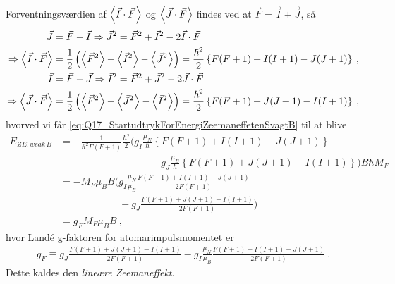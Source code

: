 Forventningsværdien af $\Braket{\Vec{I} \cdot \Vec{F}}$ og $\Braket{\Vec{J} \cdot \Vec{F}}$ findes ved at $\Vec{F} = \Vec{I} + \Vec{J}$, så
\begin{align}
    \Vec{J} &= \Vec{F} - \Vec{I} \Rightarrow \Vec{J}^2 = \Vec{F}^2 + \Vec{I}^2 - 2\Vec{I} \cdot \Vec{F} \nonumber\\
    \Rightarrow \Braket{\Vec{I} \cdot \Vec{F}} &= \frac{1}{2} \left(\Braket{\Vec{F}^2} + \Braket{\Vec{I}^2} - \Braket{\Vec{J}^2}\right) = \frac{\hbar^2}{2} \left\{F(F+1) + I(I+1) - J(J+1)\right\} \: , \\
    \Vec{I} &= \Vec{F} - \Vec{J} \Rightarrow \Vec{I}^2 = \Vec{F}^2 + \Vec{J}^2 - 2\Vec{J} \cdot \Vec{F} \nonumber\\
    \Rightarrow \Braket{\Vec{J} \cdot \Vec{F}} &= \frac{1}{2} \left(\Braket{\Vec{F}^2} + \Braket{\Vec{J}^2} - \Braket{\Vec{I}^2}\right) = \frac{\hbar^2}{2} \left\{F(F+1) + J(J+1) - I(I+1)\right\} \: ,
\end{align}
hvorved vi får \cref{eq:Q17_StartudtrykForEnergiZeemaneffetenSvagtB} til at blive
\begin{align} \label{eq:Q17_EnergiZeemanSvagtBfelt}
    E_{ZE,weak\,B} &= - \frac{1}{\hbar^2 F(F+1)} \frac{\hbar^2}{2}\bigg(g_I \frac{\mu_N}{\hbar} \left\{F(F+1) + I(I+1) - J(J+1)\right\} \nonumber\\
    &\qquad \qquad \qquad \qquad \quad - g_J \frac{\mu_B}{\hbar} \left\{F(F+1) + J(J+1) - I(I+1)\right\}\bigg) B \hbar M_F \nonumber\\
    &= - M_F \mu_B B \bigg(g_I \frac{\mu_N}{\mu_B} \frac{F(F+1) + I(I+1) - J(J+1)}{2F(F+1)} \nonumber\\
    &\qquad \qquad \qquad - g_J \frac{F(F+1) + J(J+1) - I(I+1)}{2F(F+1)}\bigg) \nonumber\\
    &= g_F M_F \mu_B B \: ,
\end{align}
hvor Landé g-faktoren for atomarimpulsmomentet er
\begin{align} \label{eq:Q17_gF}
    g_F \equiv g_J \frac{F(F+1) + J(J+1) - I(I+1)}{2F(F+1)} - g_I \frac{\mu_N}{\mu_B} \frac{F(F+1) + I(I+1) - J(J+1)}{2F(F+1)} \: .
\end{align}
Dette kaldes den \emph{lineære Zeemaneffekt}.\\

